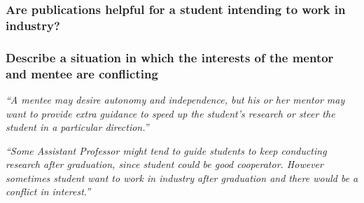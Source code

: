 \documentclass[12pt]{beamer}
\newcommand\ans[1]{{\it ``#1''}}
\newcommand\gap{\vspace{5mm}}
\begin{document}
\begin{frame}

  \frametitle{Are publications helpful for a student intending to work in industry?}
    




\end{frame}

\begin{frame} %
\frametitle{Describe a situation in which the interests of the mentor and mentee are conflicting}


\ans{A mentee may desire autonomy and independence,  but  his  or  her  mentor  may  want  to  provide  extra  guidance  to  speed  up  the student’s research or steer the student in a particular direction.}

\gap

\ans{Some  Assistant  Professor  might  tend  to  guide  students  to  keep  conducting  research after graduation, since student could be good cooperator.  However sometimes student want to work in industry after graduation and there would be a conflict in interest.}

\end{frame}
\end{document}
